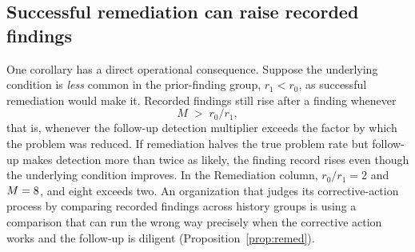 \subsection{Successful remediation can raise recorded findings}

One corollary has a direct operational consequence. Suppose the underlying
condition is \emph{less} common in the prior-finding group, $r_1 < r_0$, as
successful remediation would make it. Recorded
findings still rise after a finding whenever
%
\begin{equation}\label{eq:reversal}
  M \;>\; r_0 / r_1 ,
\end{equation}
%
that is, whenever the follow-up detection multiplier exceeds the factor by
which the problem was reduced. If remediation halves the true problem rate but
follow-up makes detection more than twice as likely, the finding record rises
even though the underlying condition improves. In the Remediation column,
$r_0/r_1 = 2$ and $M = 8{}$, and eight exceeds two. An
organization that judges its corrective-action process by comparing recorded
findings across history groups is using a comparison that can run the wrong
way precisely when the corrective action works and the follow-up is diligent
(Proposition~\ref{prop:remed}).


